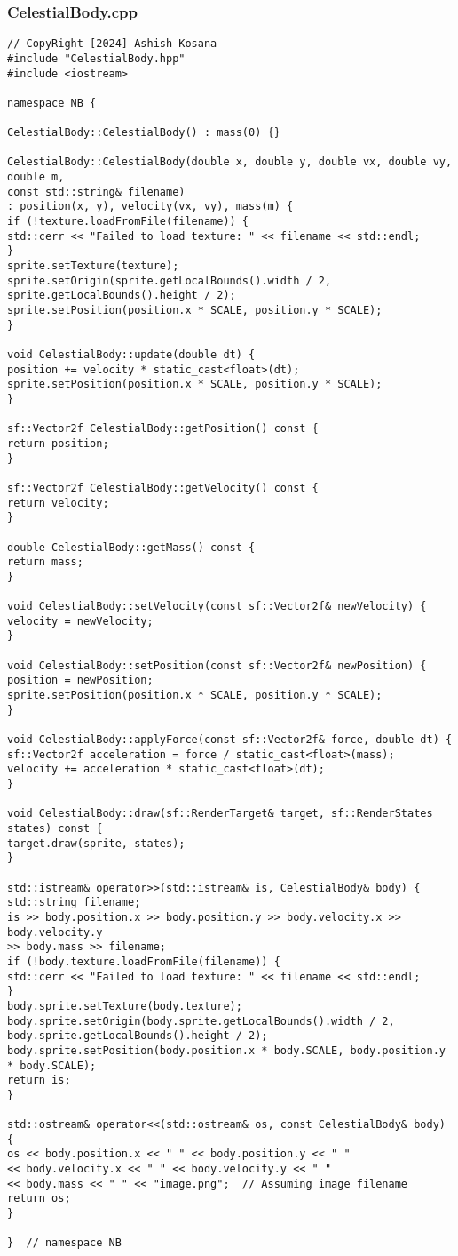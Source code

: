 \documentclass[12pt]{article}
\begin{document}
\subsubsection{CelestialBody.cpp}
\begin{lstlisting}[style=cppcode]
// CopyRight [2024] Ashish Kosana
#include "CelestialBody.hpp"
#include <iostream>

namespace NB {

CelestialBody::CelestialBody() : mass(0) {}

CelestialBody::CelestialBody(double x, double y, double vx, double vy, double m,
const std::string& filename)
: position(x, y), velocity(vx, vy), mass(m) {
if (!texture.loadFromFile(filename)) {
std::cerr << "Failed to load texture: " << filename << std::endl;
}
sprite.setTexture(texture);
sprite.setOrigin(sprite.getLocalBounds().width / 2, sprite.getLocalBounds().height / 2);
sprite.setPosition(position.x * SCALE, position.y * SCALE);
}

void CelestialBody::update(double dt) {
position += velocity * static_cast<float>(dt);
sprite.setPosition(position.x * SCALE, position.y * SCALE);
}

sf::Vector2f CelestialBody::getPosition() const {
return position;
}

sf::Vector2f CelestialBody::getVelocity() const {
return velocity;
}

double CelestialBody::getMass() const {
return mass;
}

void CelestialBody::setVelocity(const sf::Vector2f& newVelocity) {
velocity = newVelocity;
}

void CelestialBody::setPosition(const sf::Vector2f& newPosition) {
position = newPosition;
sprite.setPosition(position.x * SCALE, position.y * SCALE);
}

void CelestialBody::applyForce(const sf::Vector2f& force, double dt) {
sf::Vector2f acceleration = force / static_cast<float>(mass);
velocity += acceleration * static_cast<float>(dt);
}

void CelestialBody::draw(sf::RenderTarget& target, sf::RenderStates states) const {
target.draw(sprite, states);
}

std::istream& operator>>(std::istream& is, CelestialBody& body) {
std::string filename;
is >> body.position.x >> body.position.y >> body.velocity.x >> body.velocity.y
>> body.mass >> filename;
if (!body.texture.loadFromFile(filename)) {
std::cerr << "Failed to load texture: " << filename << std::endl;
}
body.sprite.setTexture(body.texture);
body.sprite.setOrigin(body.sprite.getLocalBounds().width / 2,
body.sprite.getLocalBounds().height / 2);
body.sprite.setPosition(body.position.x * body.SCALE, body.position.y * body.SCALE);
return is;
}

std::ostream& operator<<(std::ostream& os, const CelestialBody& body) {
os << body.position.x << " " << body.position.y << " "
<< body.velocity.x << " " << body.velocity.y << " "
<< body.mass << " " << "image.png";  // Assuming image filename
return os;
}

}  // namespace NB

\end{lstlisting}
\end{document}
